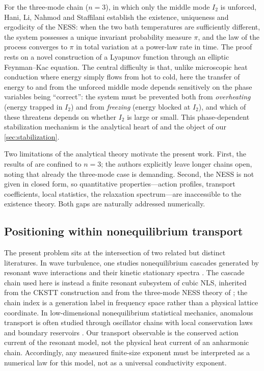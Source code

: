\documentclass[11pt,a4paper]{article}
\theoremstyle{definition}
\numberwithin{equation}{section}   %
\begin{document}
For the three-mode chain ($n=3$), in which only the middle mode $I_2$ is
unforced, Hani, Li, Nahmod and Staffilani \cite{HLNS} establish the existence,
uniqueness and ergodicity of the NESS: when the two bath temperatures are
sufficiently different, the system possesses a unique invariant probability
measure $\pi$, and the law of the process converges to $\pi$ in total variation
at a power-law rate in time. The proof rests on a novel construction of a
Lyapunov function through an elliptic Feynman--Kac equation. The central
difficulty is that, unlike microscopic heat conduction where energy simply flows
from hot to cold, here the transfer of energy to and from the unforced middle
mode depends sensitively on the phase variables being ``correct'': the system
must be prevented both from \emph{overheating} (energy trapped in $I_2$) and from
\emph{freezing} (energy blocked at $I_2$), and which of these threatens depends on
whether $I_2$ is large or small. This phase-dependent stabilization mechanism is
the analytical heart of \cite{HLNS} and the object of our \cref{sec:stabilization}.

Two limitations of the analytical theory motivate the present work. First, the
results of \cite{HLNS} are confined to $n=3$; the authors explicitly leave longer
chains open, noting that already the three-mode case is demanding. Second, the
NESS is not given in closed form, so quantitative properties---action profiles,
transport coefficients, local statistics, the relaxation spectrum---are
inaccessible to the existence theory. Both gaps are naturally addressed
numerically.

\subsection{Positioning within nonequilibrium transport}
\label{sec:positioning}

The present problem sits at the intersection of two related but distinct
literatures. In wave turbulence, one studies nonequilibrium cascades generated
by resonant wave interactions and their kinetic stationary spectra
\cite{Nazarenko}. The cascade chain used here is instead a finite resonant
subsystem of cubic NLS, inherited from the CKSTT construction \cite{CKSTT} and
from the three-mode NESS theory of \cite{HLNS}; the chain index is a generation
label in frequency space rather than a physical lattice coordinate. In
low-dimensional nonequilibrium statistical mechanics, anomalous transport is
often studied through oscillator chains with local conservation laws and
boundary reservoirs \cite{LepriLiviPoliti,Dhar2008,Spohn2014}. Our transport
observable is the conserved action current of the resonant model, not the
physical heat current of an anharmonic chain. Accordingly, any measured
finite-size exponent must be interpreted as a numerical law for this model,
not as a universal conductivity exponent.
\end{document}
